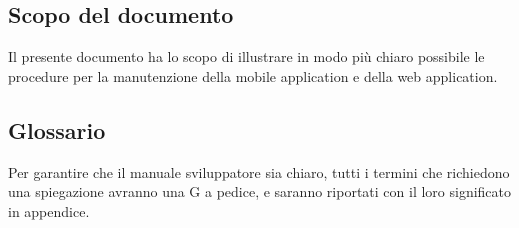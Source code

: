 \documentclass[../manuale-manutentore.tex]{subfiles}
\begin{document}
\subsection{Scopo del documento}%
\label{sub:scopo_del_documento}
Il presente documento ha lo scopo di illustrare in modo più chiaro possibile le procedure per la manutenzione della mobile application e della web application.

\subsection{Glossario}%
\label{sub:glossario}
Per garantire che il manuale sviluppatore sia chiaro, tutti i termini che richiedono una spiegazione avranno una G a pedice, e saranno riportati con il loro significato in appendice.
\end{document}

